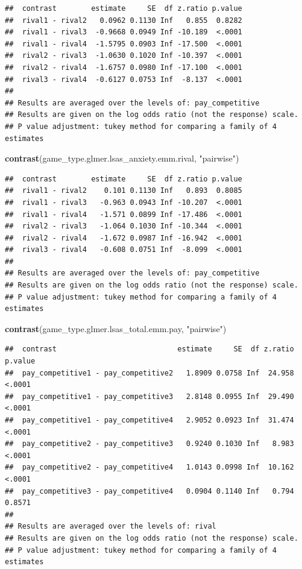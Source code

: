\documentclass[
]{article}
\newenvironment{Shaded}{\begin{snugshade}}{\end{snugshade}}
\newcommand{\FunctionTok}[1]{\textcolor[rgb]{0.13,0.29,0.53}{\textbf{#1}}}
\newcommand{\NormalTok}[1]{#1}
\newcommand{\StringTok}[1]{\textcolor[rgb]{0.31,0.60,0.02}{#1}}
\begin{document}
\begin{verbatim}
##  contrast        estimate     SE  df z.ratio p.value
##  rival1 - rival2   0.0962 0.1130 Inf   0.855  0.8282
##  rival1 - rival3  -0.9668 0.0949 Inf -10.189  <.0001
##  rival1 - rival4  -1.5795 0.0903 Inf -17.500  <.0001
##  rival2 - rival3  -1.0630 0.1020 Inf -10.397  <.0001
##  rival2 - rival4  -1.6757 0.0980 Inf -17.100  <.0001
##  rival3 - rival4  -0.6127 0.0753 Inf  -8.137  <.0001
## 
## Results are averaged over the levels of: pay_competitive 
## Results are given on the log odds ratio (not the response) scale. 
## P value adjustment: tukey method for comparing a family of 4 estimates
\end{verbatim}

\begin{Shaded}
\begin{Highlighting}[]
\FunctionTok{contrast}\NormalTok{(game\_type.glmer.lsas\_anxiety.emm.rival, }\StringTok{"pairwise"}\NormalTok{)}
\end{Highlighting}
\end{Shaded}

\begin{verbatim}
##  contrast        estimate     SE  df z.ratio p.value
##  rival1 - rival2    0.101 0.1130 Inf   0.893  0.8085
##  rival1 - rival3   -0.963 0.0943 Inf -10.207  <.0001
##  rival1 - rival4   -1.571 0.0899 Inf -17.486  <.0001
##  rival2 - rival3   -1.064 0.1030 Inf -10.344  <.0001
##  rival2 - rival4   -1.672 0.0987 Inf -16.942  <.0001
##  rival3 - rival4   -0.608 0.0751 Inf  -8.099  <.0001
## 
## Results are averaged over the levels of: pay_competitive 
## Results are given on the log odds ratio (not the response) scale. 
## P value adjustment: tukey method for comparing a family of 4 estimates
\end{verbatim}

\begin{Shaded}
\begin{Highlighting}[]
\FunctionTok{contrast}\NormalTok{(game\_type.glmer.lsas\_total.emm.pay, }\StringTok{"pairwise"}\NormalTok{)}
\end{Highlighting}
\end{Shaded}

\begin{verbatim}
##  contrast                            estimate     SE  df z.ratio p.value
##  pay_competitive1 - pay_competitive2   1.8909 0.0758 Inf  24.958  <.0001
##  pay_competitive1 - pay_competitive3   2.8148 0.0955 Inf  29.490  <.0001
##  pay_competitive1 - pay_competitive4   2.9052 0.0923 Inf  31.474  <.0001
##  pay_competitive2 - pay_competitive3   0.9240 0.1030 Inf   8.983  <.0001
##  pay_competitive2 - pay_competitive4   1.0143 0.0998 Inf  10.162  <.0001
##  pay_competitive3 - pay_competitive4   0.0904 0.1140 Inf   0.794  0.8571
## 
## Results are averaged over the levels of: rival 
## Results are given on the log odds ratio (not the response) scale. 
## P value adjustment: tukey method for comparing a family of 4 estimates
\end{verbatim}
\end{document}
